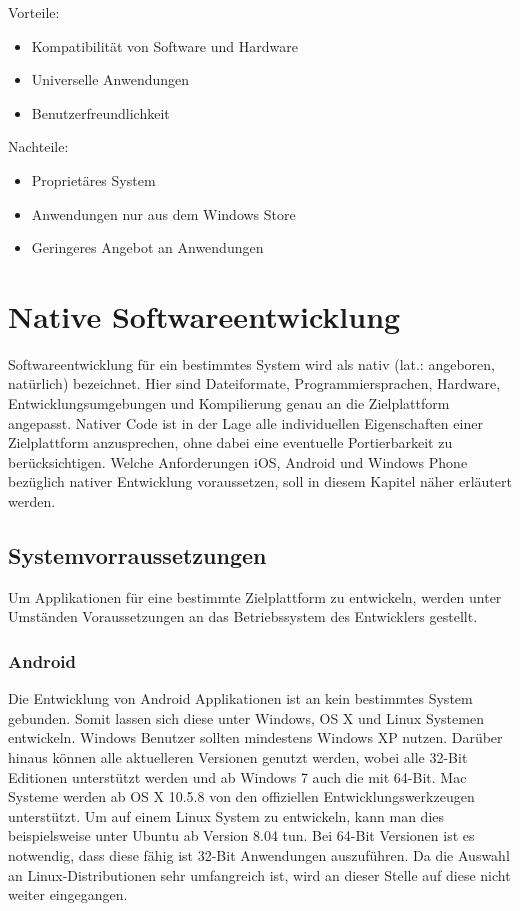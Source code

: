 Vorteile:
\begin{itemize}
	\item Kompatibilität von Software und Hardware
	\item Universelle Anwendungen
	\item Benutzerfreundlichkeit
\end{itemize}

Nachteile:
\begin{itemize}
	\item Proprietäres System
	\item Anwendungen nur aus dem Windows Store
	\item Geringeres Angebot an Anwendungen
\end{itemize}
\citep{wp_pros_cons}


\chapter{Native Softwareentwicklung}
Softwareentwicklung für ein bestimmtes System wird als nativ (lat.: angeboren, natürlich) bezeichnet. Hier sind Dateiformate, Programmiersprachen, Hardware, Entwicklungsumgebungen und Kompilierung genau an die Zielplattform angepasst. Nativer Code ist in der Lage alle individuellen Eigenschaften einer Zielplattform anzusprechen, ohne dabei eine eventuelle Portierbarkeit zu berücksichtigen.
\citep{native_software}
Welche Anforderungen iOS, Android und Windows Phone bezüglich nativer Entwicklung voraussetzen, soll in diesem Kapitel näher erläutert werden.

\section{Systemvorraussetzungen}
Um Applikationen für eine bestimmte Zielplattform zu entwickeln, werden unter Umständen Voraussetzungen an das Betriebssystem des Entwicklers gestellt.

\subsection{Android}
Die Entwicklung von Android Applikationen ist an kein bestimmtes System gebunden. Somit lassen sich diese unter Windows, OS X und Linux Systemen entwickeln. 
Windows Benutzer sollten mindestens Windows XP nutzen. Darüber hinaus können alle aktuelleren Versionen genutzt werden, wobei alle 32-Bit Editionen unterstützt werden und ab Windows 7 auch die mit 64-Bit.
Mac Systeme werden ab OS X 10.5.8 von den offiziellen Entwicklungswerkzeugen unterstützt.
Um auf einem Linux System zu entwickeln, kann man dies beispielsweise unter Ubuntu ab Version 8.04 tun. Bei 64-Bit Versionen ist es notwendig, dass diese fähig ist 32-Bit Anwendungen auszuführen. Da die Auswahl an Linux-Distributionen sehr umfangreich ist, wird an dieser Stelle auf diese nicht weiter eingegangen.
\citep{android_sdk_requirements}


